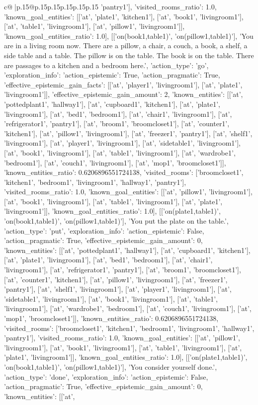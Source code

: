 \documentclass{article}
\begin{document}
{\begin{supertabular}{c@{$\;$}|p{.15\linewidth}@{}p{.15\linewidth}p{.15\linewidth}p{.15\linewidth}p{.15\linewidth}p{.15\linewidth}}
{{{'pantry1'], 'visited_rooms_ratio': 1.0, 'known_goal_entities': [['at', 'plate1', 'kitchen1'], ['at', 'book1', 'livingroom1'], ['at', 'table1', 'livingroom1'], ['at', 'pillow1', 'livingroom1']], 'known_goal_entities_ratio': 1.0}}], [['on(book1,table1)', 'on(pillow1,table1)'], 'You are in a living room now. There are a pillow, a chair, a couch, a book, a shelf, a side table and a table. The pillow is on the table. The book is on the table. There are passages to a kitchen and a bedroom here.', {'action_type': 'go', 'exploration_info': {'action_epistemic': True, 'action_pragmatic': True, 'effective_epistemic_gain_facts': [['at', 'player1', 'livingroom1'], ['at', 'plate1', 'livingroom1']], 'effective_epistemic_gain_amount': 2, 'known_entities': [['at', 'pottedplant1', 'hallway1'], ['at', 'cupboard1', 'kitchen1'], ['at', 'plate1', 'livingroom1'], ['at', 'bed1', 'bedroom1'], ['at', 'chair1', 'livingroom1'], ['at', 'refrigerator1', 'pantry1'], ['at', 'broom1', 'broomcloset1'], ['at', 'counter1', 'kitchen1'], ['at', 'pillow1', 'livingroom1'], ['at', 'freezer1', 'pantry1'], ['at', 'shelf1', 'livingroom1'], ['at', 'player1', 'livingroom1'], ['at', 'sidetable1', 'livingroom1'], ['at', 'book1', 'livingroom1'], ['at', 'table1', 'livingroom1'], ['at', 'wardrobe1', 'bedroom1'], ['at', 'couch1', 'livingroom1'], ['at', 'mop1', 'broomcloset1']], 'known_entities_ratio': 0.6206896551724138, 'visited_rooms': ['broomcloset1', 'kitchen1', 'bedroom1', 'livingroom1', 'hallway1', 'pantry1'], 'visited_rooms_ratio': 1.0, 'known_goal_entities': [['at', 'pillow1', 'livingroom1'], ['at', 'book1', 'livingroom1'], ['at', 'table1', 'livingroom1'], ['at', 'plate1', 'livingroom1']], 'known_goal_entities_ratio': 1.0}}], [['on(plate1,table1)', 'on(book1,table1)', 'on(pillow1,table1)'], 'You put the plate on the table.', {'action_type': 'put', 'exploration_info': {'action_epistemic': False, 'action_pragmatic': True, 'effective_epistemic_gain_amount': 0, 'known_entities': [['at', 'pottedplant1', 'hallway1'], ['at', 'cupboard1', 'kitchen1'], ['at', 'plate1', 'livingroom1'], ['at', 'bed1', 'bedroom1'], ['at', 'chair1', 'livingroom1'], ['at', 'refrigerator1', 'pantry1'], ['at', 'broom1', 'broomcloset1'], ['at', 'counter1', 'kitchen1'], ['at', 'pillow1', 'livingroom1'], ['at', 'freezer1', 'pantry1'], ['at', 'shelf1', 'livingroom1'], ['at', 'player1', 'livingroom1'], ['at', 'sidetable1', 'livingroom1'], ['at', 'book1', 'livingroom1'], ['at', 'table1', 'livingroom1'], ['at', 'wardrobe1', 'bedroom1'], ['at', 'couch1', 'livingroom1'], ['at', 'mop1', 'broomcloset1']], 'known_entities_ratio': 0.6206896551724138, 'visited_rooms': ['broomcloset1', 'kitchen1', 'bedroom1', 'livingroom1', 'hallway1', 'pantry1'], 'visited_rooms_ratio': 1.0, 'known_goal_entities': [['at', 'pillow1', 'livingroom1'], ['at', 'book1', 'livingroom1'], ['at', 'table1', 'livingroom1'], ['at', 'plate1', 'livingroom1']], 'known_goal_entities_ratio': 1.0}}], [['on(plate1,table1)', 'on(book1,table1)', 'on(pillow1,table1)'], 'You consider yourself done.', {'action_type': 'done', 'exploration_info': {'action_epistemic': False, 'action_pragmatic': True, 'effective_epistemic_gain_amount': 0, 'known_entities': [['at', }}}
\end{supertabular}}
\end{document}
